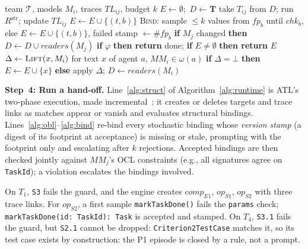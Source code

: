 \documentclass[10pt,conference]{IEEEtran}
\theoremstyle{definition}
\newcommand{\tool}{\textsc{AgentM2M}}
\newcommand{\MM}{\mathit{MM}}
\newcommand{\TL}{\mathit{TL}}
\newcommand{\team}{\mathcal{T}}
\newcommand{\str}{\mathrm{str}}
\newcommand{\code}[1]{\texttt{#1}}
\newcommand{\step}[1]{\textcircled{\scriptsize #1}}
\newcommand{\fp}{\mathit{fp}}
\begin{document}
\begin{algorithm}[t]
\caption{\tool{} runtime (\step{n}: Step~n).}
\label{alg:runtime}
\footnotesize
\begin{algorithmic}[1]
\Require team $\team$, models $M_i$, traces $\TL_{ij}$, budget $k$
\State $E\gets\emptyset$;\ $D\gets\mathbf{T}$
\Loop
   \Comment{\step{4}\,\step{6}}
    \State take $T_{ij}$ from $D$; run $R^{\str}$; update $\TL_{ij}$
      \label{alg:struct}
      \label{alg:obl}
      \If{$\#\fp_b$ equals the failed stamp of $(t,b)$}
        \State $E\gets E\cup\{(t,b)\}$ \label{alg:memo}
      \Else
        \State \textsc{Bind}: sample $\le k$ values from $\fp_b$ until
          $\mathit{chk}_b$, else $E\gets E\cup\{(t,b)\}$, failed stamp
          $\gets\#\fp_b$ \label{alg:bind}
      \EndIf
    \EndFor
    \State \textbf{if} $M_j$ changed \textbf{then} $D\gets D\cup\mathit{readers}(M_j)$
  \EndWhile
  \State \textbf{if} $\varphi$ \textbf{then return} done;
    \textbf{if} $E\neq\emptyset$ \textbf{then return} $E$
    \Comment{\step{7}}
  \State $\Delta\gets\textsc{Lift}(x,M_i)$ for text $x$ of agent $a$,
    $\MM_i\in\omega(a)$ \label{alg:lift} \Comment{\step{5}}
  \State \textbf{if} $\Delta=\bot$ \textbf{then} $E\gets E\cup\{x\}$
    \textbf{else} apply $\Delta$; $D\gets\mathit{readers}(M_i)$
\EndLoop
\end{algorithmic}
\end{algorithm}

\smallskip\noindent\textbf{Step~4: Run a hand-off.}
Line~\ref{alg:struct} of Algorithm~\ref{alg:runtime} is ATL's two-phase
execution, made incremental~\cite{jouault2010incremental}: it creates or
deletes targets and trace links as matches appear or vanish and evaluates
structural bindings.
Lines~\ref{alg:obl}--\ref{alg:bind} re-bind every stochastic binding whose
\emph{version stamp} (a digest of its footprint at acceptance) is missing
or stale, prompting with the footprint only and escalating after $k$
rejections. Accepted bindings are then checked jointly against $\MM_j$'s
OCL constraints (e.g., all signatures agree on \code{TaskId}); a violation
escalates the bindings involved.

On $T_1$, \code{S3} fails the guard, and the engine creates
$\mathit{comp}_{E1}$, $\mathit{op}_{S1}$, $\mathit{op}_{S2}$ with three
trace links. For $\mathit{op}_{S2}$, a first sample \code{markTaskDone()}
fails the \code{params} check; \code{markTaskDone(id: TaskId): Task} is
accepted and stamped. On $T_4$, \code{S3.1} fails the guard, but
\code{S2.1} cannot be dropped: \code{Criterion2TestCase} matches it, so its
test case exists by construction: the P1 episode is closed by a rule, not a
prompt.
\end{document}
